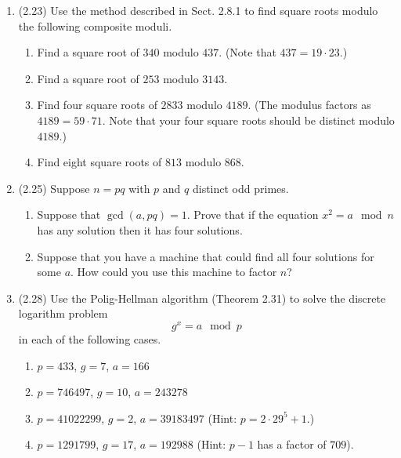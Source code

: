 \documentclass[12pt]{amsart}
\theoremstyle{definition}
\begin{document}
\begin{enumerate}
	\item (2.23) Use the method described in Sect. 2.8.1 to find square 
		roots modulo the following composite moduli.
	\begin{enumerate}
		\item Find a square root of $340$ modulo $437$. (Note that 
			$437 = 19 \cdot 23$.) 
		\item Find a square root of $253$ modulo $3143$. 
		\item Find four square roots of $2833$ modulo $4189$. (The 
			modulus factors as $4189 = 59\cdot 71$. Note that your 
			four square roots should be distinct modulo $4189$.)
		\item Find eight square roots of $813$ modulo $868$. 
	\end{enumerate}
	\item (2.25) Suppose $n=pq$ with $p$ and $q$ distinct odd primes. 
	\begin{enumerate}
		\item Suppose that $\operatorname{gcd}(a,pq) = 1$. Prove that 
			if the equation $x^2 = a \mod n$ has any solution 
			then it has four solutions. 
		\item Suppose that you have a machine that could find all four 
			solutions for some $a$. How could you use this machine 
			to factor $n$?
	\end{enumerate}
	\item (2.28) Use the Polig-Hellman algorithm (Theorem 2.31) to solve 
		the discrete logarithm problem 
		\begin{displaymath}
			g^x = a \mod p 
		\end{displaymath}
		in each of the following cases. 
	\begin{enumerate}
		\item $p=433$, $g=7$, $a=166$
		\item $p=746497$, $g=10$, $a=243278$
		\item $p=41022299$, $g=2$, $a=39183497$ (Hint: $p = 2 \cdot 29^5 
			+ 1$.)
		\item $p=1291799$, $g=17$, $a=192988$ (Hint: $p-1$ has a factor 
			of $709$). 
	\end{enumerate}
\end{enumerate}
\end{document}
